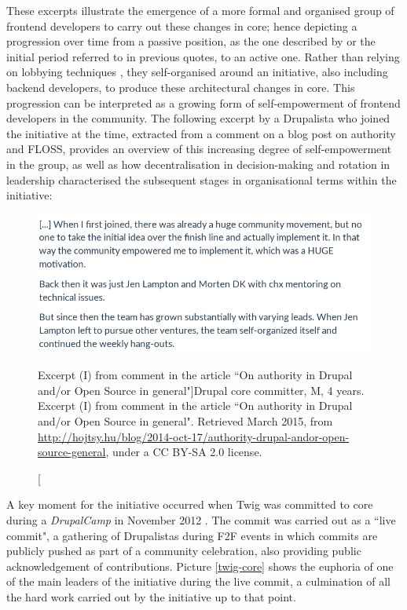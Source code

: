 These excerpts illustrate the emergence of a more formal and organised group of frontend developers to carry out  these changes in core; hence depicting a progression over time from a passive position, as the one described by \textcite{Zilouchian2011} or the initial period referred to in previous quotes, to an active one. Rather than relying on lobbying techniques \parencite{Zilouchian2011}, they self-organised around an initiative, also including backend developers, to produce these architectural changes in core. This progression can be interpreted as a growing form of self-empowerment of frontend developers in the community.  The following excerpt by a Drupalista who joined the initiative at the time, extracted from a comment on a blog post on authority and FLOSS, provides an overview of this increasing degree of self-empowerment in the group, as well as how decentralisation in decision-making and rotation in leadership characterised the subsequent stages in organisational terms within the initiative:

\begin{figure}[H]
 \centering
 \includegraphics[scale=0.5]{img/quotes_replacement/quote_twig_cc.png}
 \caption[Excerpt (I) from comment in the article ``On authority in Drupal and/or Open Source in general"]{Drupal core committer, M, 4 years. Excerpt (I) from comment in the article ``On authority in Drupal and/or Open Source in general". Retrieved  March 2015, from \url{http://hojtsy.hu/blog/2014-oct-17/authority-drupal-andor-open-source-general}, under a CC BY-SA 2.0 license.}
\label{quote_twig_core_01}
\end{figure}

A key moment for the initiative occurred when Twig was committed to core during a \textit{DrupalCamp} in November 2012 \parencite{badcamp2012:Online}. The commit was carried out as a ``live commit", a gathering of Drupalistas during F2F events in which commits are publicly pushed as part of a community celebration, also providing public acknowledgement of contributions. Picture \ref{twig-core} shows the euphoria of one of the main leaders of the initiative during the live commit, a culmination of all the hard work carried out by the initiative up to that point.

